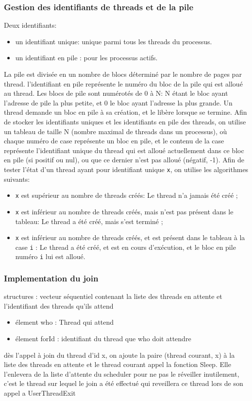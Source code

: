 \documentclass{article}
\begin{document}
		\subsubsection{Gestion des identifiants de threads et de la pile}
			{Deux identifiants:}
			\begin{itemize}
				\item{un identifiant unique: unique parmi tous les threads du processus.}
				\item{un identifiant en pile : pour les processus actifs.}
			\end{itemize}
			{La pile est divisée en un nombre de blocs déterminé par le nombre de pages par thread. l'identifiant en pile représente le numéro du bloc de la pile qui est alloué au thread. Les blocs de pile sont numérotés de 0 à N: N étant le bloc ayant l'adresse de pile la plus petite, et 0 le bloc ayant l'adresse la plus grande. Un thread demande un bloc en pile à sa création, et le libère lorsque se termine. \newline{}
			Afin de stocker les identifiants uniques et les identifiants en pile des threads, on utilise un tableau de taille N (nombre maximal de threads dans un processus), où chaque numéro de case représente un bloc en pile, et le contenu de la case représente l'identifiant unique du thread qui est alloué actuellement dans ce bloc en pile (si positif ou nul), ou que ce dernier n'est pas alloué (négatif, -1).\newline{}
			Afin de tester l'état d'un thread ayant pour identifiant unique \texttt{x}, on utilise les algorithmes suivants: }
				\begin{itemize}
					\item{\texttt{x} est supérieur au nombre de threads créés: } Le thread n'a jamais été créé ;
					\item{\texttt{x} est inférieur au nombre de threads créés, mais n'est pas présent dans le tableau: } Le thread a été créé, mais s'est terminé ;
					\item{\texttt{x} est inférieur au nombre de threads créés, et est présent dans le tableau à la case \texttt{i} : Le thread a été créé, et est en cours d'exécution, et le bloc en pile numéro \texttt{i} lui est alloué.}
				\end{itemize}
		\subsubsection{Implementation du join}
			structures : vecteur séquentiel contenant la liste des threads en attente et l'identifiant des threads qu'ils attend
				\begin{itemize}
					\item élement who : Thread qui attend
					\item élement forId : identifiant du thread que who doit attendre
				\end{itemize}
			dès l'appel à join du thread d'id x, on ajoute la paire (thread courant, x) à la liste des threads en attente et le thread courant appel la fonction Sleep. Elle l'enlevera de la liste d'attente du scheduler pour ne pas le réveiller inutilement, c'est le thread sur lequel le join a été effectué qui reveillera ce thread lors de son appel a UserThreadExit
\end{document}
